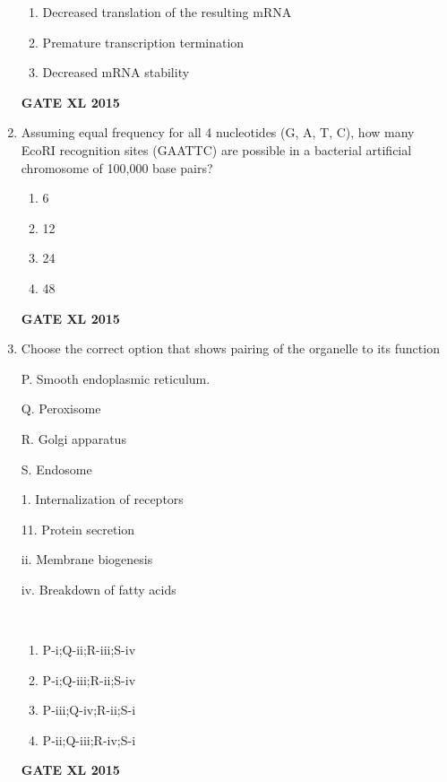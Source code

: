 \documentclass[journal,12pt,onecolumn]{IEEEtran}
\begin{document}
\begin{enumerate}
\begin{enumerate}
	    \item Decreased translation of the resulting mRNA
	    \item Premature transcription termination
            \item  Decreased mRNA stability
    \end{enumerate}
\begin{flushright}\textbf{GATE XL 2015}\end{flushright}
\item Assuming equal frequency for all 4 nucleotides (G, A, T, C), how many EcoRI recognition sites (GAATTC) are possible in a bacterial artificial chromosome of 100,000 base pairs?
    \begin{enumerate}
            \item 6
	    \item 12
	    \item 24
            \item 48
    \end{enumerate}
\begin{flushright}\textbf{GATE XL 2015}\end{flushright}
\item  Choose the correct option that shows pairing of the organelle to its function\\
	\begin{minipage}{0.5\textwidth}\begin{flushleft}
P. Smooth endoplasmic reticulum.

Q. Peroxisome

R. Golgi apparatus

S. Endosome
	\end{flushleft}
	\end{minipage}
	\begin{minipage}{0.5\textwidth}\begin{flushleft}
1. Internalization of receptors

11. Protein secretion

ii. Membrane biogenesis 

iv. Breakdown of fatty acids
	\end{flushleft}
	\end{minipage}\\
    \begin{enumerate}
            \item P-i;Q-ii;R-iii;S-iv
            \item P-i;Q-iii;R-ii;S-iv
            \item P-iii;Q-iv;R-ii;S-i
            \item P-ii;Q-iii;R-iv;S-i
    \end{enumerate}
\begin{flushright}\textbf{GATE XL 2015}\end{flushright}


\end{enumerate}
\end{document}
